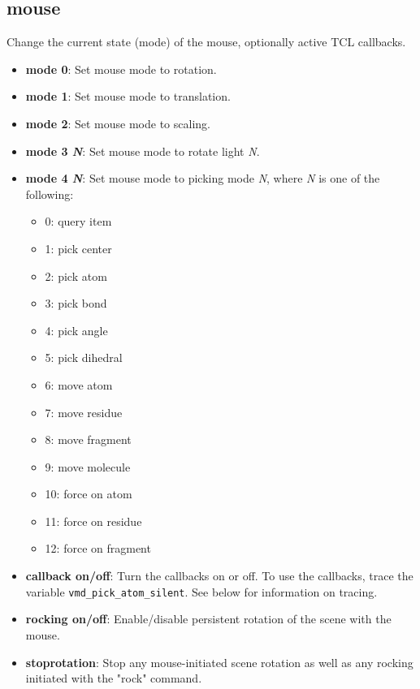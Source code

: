   \subsection{mouse}
Change the current state (mode) of the mouse, optionally active TCL
callbacks.
  \begin{itemize}
    \item {\bf mode 0}: Set mouse mode to rotation.
    \item {\bf mode 1}: Set mouse mode to translation.
    \item {\bf mode 2}: Set mouse mode to scaling.
    \item {\bf mode 3 {\it N}}: Set mouse mode to rotate light {\it N}.
    \item {\bf mode 4 {\it N}}: Set mouse mode to picking mode {\it N}, where
{\it N} is one of the following:
	\begin{itemize}
		\item 0: query item
		\item 1: pick center
		\item 2: pick atom
		\item 3: pick bond
		\item 4: pick angle
		\item 5: pick dihedral
		\item 6: move atom
		\item 7: move residue
		\item 8: move fragment
		\item 9: move molecule
		\item 10: force on atom
		\item 11: force on residue
		\item 12: force on fragment
	\end{itemize}
  \end{itemize}
  \begin{itemize}
    \item {\bf callback on/off}: Turn the callbacks on or off.  To
    use the callbacks, trace the variable \verb^vmd_pick_atom_silent^.
    See below for information on tracing.
    \item {\bf rocking on/off}: Enable/disable persistent rotation of the
    scene with the mouse.
    \item {\bf stoprotation}: Stop any mouse-initiated scene rotation as well
    as any rocking initiated with the "rock" command.
  \end{itemize}

